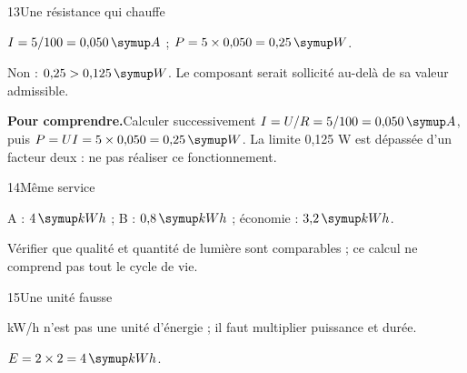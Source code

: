 \par\noindent\begin{minipage}{\linewidth}
\begin{corrige}{13}{Une résistance qui chauffe}
\begin{questions}
\item $I=5/100=0{,}050\unite A$ ; $P=5\times0{,}050=0{,}25\unite W$.
\item Non : $0{,}25>0{,}125\unite W$. Le composant serait sollicité au-delà de sa valeur admissible.
\end{questions}
\par\smallskip\noindent\textbf{Pour comprendre.}\enspace Calculer successivement $I=U/R=5/100=0{,}050\unite A$, puis $P=UI=5\times0{,}050=0{,}25\unite W$. La limite 0,125 W est dépassée d’un facteur deux : ne pas réaliser ce fonctionnement.\par
\end{corrige}
\end{minipage}
\par\noindent\begin{minipage}{\linewidth}
\begin{corrige}{14}{Même service}
\begin{questions}
\item A : $4\unite{kWh}$ ; B : $0{,}8\unite{kWh}$ ; économie : $3{,}2\unite{kWh}$.
\item Vérifier que qualité et quantité de lumière sont comparables ; ce calcul ne comprend pas tout le cycle de vie.
\end{questions}
\end{corrige}
\end{minipage}
\par\noindent\begin{minipage}{\linewidth}
\begin{corrige}{15}{Une unité fausse}
\begin{questions}
\item kW/h n’est pas une unité d’énergie ; il faut multiplier puissance et durée.
\item $E=2\times2=4\unite{kWh}$.
\end{questions}
\end{corrige}
\end{minipage}
